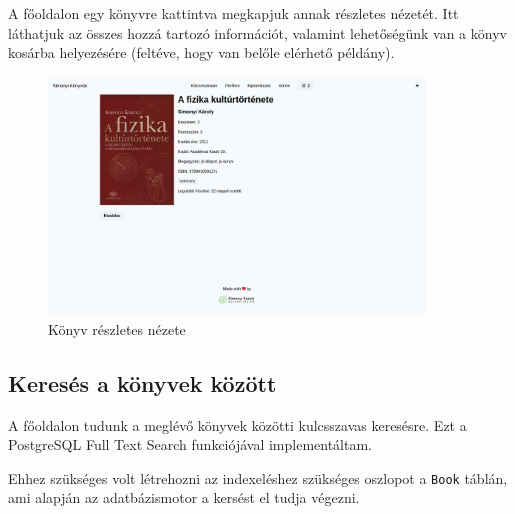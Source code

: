 A főoldalon egy könyvre kattintva megkapjuk annak részletes nézetét. Itt láthatjuk az összes hozzá tartozó információt, valamint
lehetőségünk van a könyv kosárba helyezésére (feltéve, hogy van belőle elérhető példány).

\begin{figure}[!ht]
  \centering
  \includegraphics[width=100mm, keepaspectratio]{figures/book-detail-view.png}
  \caption{Könyv részletes nézete}
  \label{fig:BookDetailView}
\end{figure}

\subsection{Keresés a könyvek között}

A főoldalon tudunk a meglévő könyvek közötti kulcsszavas keresésre. Ezt a PostgreSQL Full Text Search funkciójával implementáltam.

Ehhez szükséges volt létrehozni az indexeléshez szükséges oszlopot a \lstinline|Book| táblán, ami alapján az adatbázismotor a kersést
el tudja végezni.

